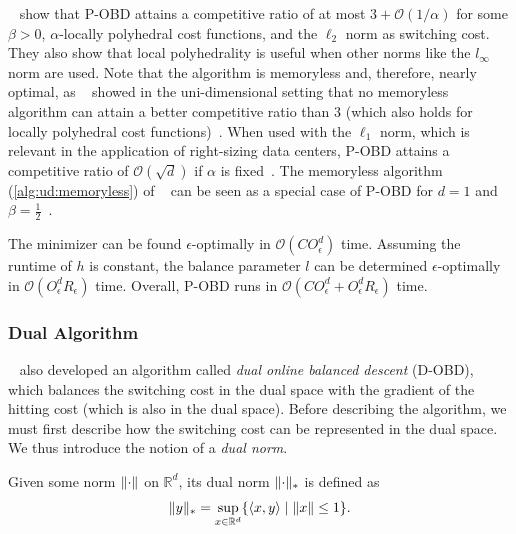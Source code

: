 \citeauthor*{Goel2018}~\cite{Goel2018} show that P-OBD attains a competitive ratio of at most $3 + \mathcal{O}(1 / \alpha)$ for some $\beta > 0$, $\alpha$-locally polyhedral cost functions, and the $\ell_2$ norm as switching cost. They also show that local polyhedrality is useful when other norms like the $l_{\infty}$ norm are used. Note that the algorithm is memoryless and, therefore, nearly optimal, as \citeauthor*{Bansal2015}~\cite{Bansal2015} showed in the uni-dimensional setting that no memoryless algorithm can attain a better competitive ratio than $3$ (which also holds for locally polyhedral cost functions)~\cite{Goel2018}. When used with the $\ell_1$ norm, which is relevant in the application of right-sizing data centers, P-OBD attains a competitive ratio of $\mathcal{O}(\sqrt{d})$ if $\alpha$ is fixed~\cite{Goel2018}. The memoryless algorithm (\cref{alg:ud:memoryless}) of \citeauthor*{Bansal2015}~\cite{Bansal2015} can be seen as a special case of P-OBD for $d = 1$ and $\beta = \frac{1}{2}$~\cite{Goel2018}.

The minimizer can be found $\epsilon$-optimally in $\mathcal{O}(C O_{\epsilon}^d)$ time. Assuming the runtime of $h$ is constant, the balance parameter $l$ can be determined $\epsilon$-optimally in $\mathcal{O}(O_{\epsilon}^d R_{\epsilon})$ time. Overall, P-OBD runs in $\mathcal{O}(C O_{\epsilon}^d + O_{\epsilon}^d R_{\epsilon})$ time.

\subsubsection{Dual Algorithm}

\citeauthor*{Goel2018}~\cite{Goel2018} also developed an algorithm called \emph{dual online balanced descent} (D-OBD), which balances the switching cost in the dual space with the gradient of the hitting cost (which is also in the dual space). Before describing the algorithm, we must first describe how the switching cost can be represented in the dual space. We thus introduce the notion of a \emph{dual norm}.

\begin{definition}
\cite{Gupta2020} Given some norm $\lVert\cdot\rVert$ on $\mathbb{R}^d$, its dual norm $\lVert\cdot\rVert_*$ is defined as \begin{align*}
    \lVert y\rVert_* = \sup_{x \in \mathbb{R}^d} \{\langle x, y \rangle \mid \lVert x\rVert \leq 1\}.
\end{align*}
\end{definition}

